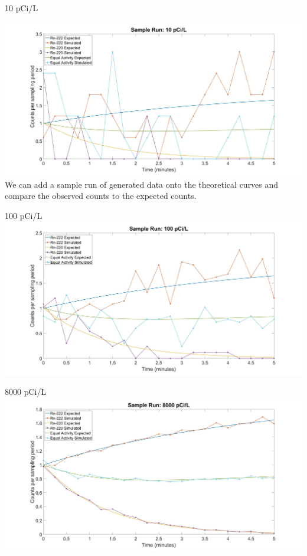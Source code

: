 \documentclass{beamer}
\newcommand{\nologo}{\setbeamertemplate{logo}{}}
\begin{document}
{\nologo
\begin{frame}{10 pCi/L}

    \includegraphics[width=\textwidth]{images/10pCipL.jpg}
    We can add a sample run of generated data onto the theoretical curves and compare the observed counts to the expected counts.
\end{frame}
\begin{frame}{100 pCi/L}
    \includegraphics[width=\textwidth]{images/100pCipL.jpg}
\end{frame}
\begin{frame}{8000 pCi/L}
    \includegraphics[width=\textwidth]{images/8000pCipL.jpg}
\end{frame}
}
\end{document}
